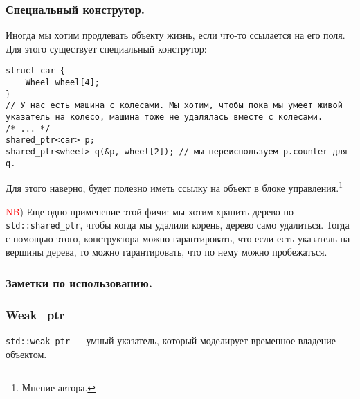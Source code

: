 \subsubsection{Специальный конструтор.}
Иногда мы хотим продлевать объекту жизнь, если что-то ссылается на его поля. Для этого существует специальный конструтор:

\begin{verbatim}
struct car {
    Wheel wheel[4];
}
// У нас есть машина с колесами. Мы хотим, чтобы пока мы умеет живой указатель на колесо, машина тоже не удалялась вместе с колесами.
/* ... */
shared_ptr<car> p;
shared_ptr<wheel> q(&p, wheel[2]); // мы переиспользуем p.counter для q.

\end{verbatim}
Для этого наверно, будет полезно иметь ссылку на объект в блоке управления.\footnote{Мнение автора.}


\textcolor{red}{NB}) Еще одно применение этой фичи: мы хотим хранить дерево по \texttt{std::shared_ptr}, чтобы когда мы удалили корень, дерево само удалиться. Тогда с помощью этого, конструктора можно гарантировать, что если есть указатель на вершины дерева, то можно гарантировать, что по нему можно пробежаться.

\subsubsection{Заметки по использованию.}
\subsubsection{Weak\_ptr}
\texttt{std::weak_ptr} --- умный указатель, который моделирует временное владение объектом.


